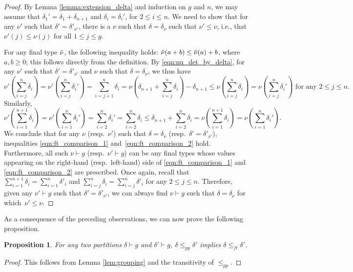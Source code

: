 \documentclass[11pt]{amsart}
\numberwithin{equation}{section}
\theoremstyle{plain}
\newcommand{\<}{\left \langle}
\renewcommand{\>}{\right \rangle}
\newtheorem{prop}[thm]{Proposition}
\theoremstyle{definition}
\theoremstyle{remark}
\begin{document}
\begin{proof} By Lemma \ref{lemma:extension_delta} and induction on $g$ and $n$, we may assume that $\delta_1' = \delta_1 + \delta_{n+1}$ and $\delta_i = \delta_i'$, for $2\leq i \leq n$. We need to show that for any $\nu'$ such that $\delta' = \delta'_{\nu'}$, there is a $\nu$ such that $\delta = \delta_{\nu}$ such that $\nu' \leq \nu$, i.e., that 
$\nu'(j) \leq \nu(j)$ for all $1\leq j \leq g$. 

For any final type $\Tilde{\nu}$, the following inequality holds: $\Tilde{\nu}(a + b) \leq \Tilde{\nu}(a) + b$, where $a, b \geq 0$; this follows directly from the definition. By \eqref{eqn:nu_det_by_delta}, for any $\nu'$ such that $\delta' = \delta'_{\nu'}$ and $\nu$ such that $\delta = \delta_{\nu}$, we thus have 
\begin{equation}
\nu'(\sum_{i = j}^{n}\delta_i) = \nu'(\sum_{i = j}^n\delta_i') = \sum_{i = j + 1}^{n}\delta_i = \nu(\delta_{n + 1} + \sum_{i = j}^{n}\delta_i) - \delta_{n + 1} \leq \nu(\sum_{i = j}^{n}\delta_i) = \nu(\sum_{i = j}^{n}\delta_i') \text{ for any }2\leq j \leq n.
\label{eqn:ft_comparison_1}
\end{equation}
Similarly, 
\begin{equation}
\nu'(\sum_{i = 1}^{n + 1}\delta_i) = \nu'(\sum_{i = 1}^n\delta_i') = \sum_{i = 2}^n\delta_i' = \sum_{i = 2}^n\delta_i \leq \delta_{n + 1} + \sum_{i = 2}^n\delta_i  = \nu(\sum_{i = 1}^{n + 1}\delta_i) = \nu(\sum_{i = 1}^{n}\delta_i').
\label{eqn:ft_comparison_2}
\end{equation}
We conclude that for any $\nu$ (resp.~$\nu'$) such that $\delta = \delta_{\nu}$ (resp.~$\delta' = \delta'_{\nu'}$), inequalities \eqref{eqn:ft_comparison_1} and~\eqref{eqn:ft_comparison_2} hold. Furthermore, all such $\nu\vdash g$ (resp.~$\nu'\vdash g$) can be any final types whose values appearing on the right-hand (resp.~left-hand) side of \eqref{eqn:ft_comparison_1} and \eqref{eqn:ft_comparison_2} are prescribed. 
Once again, recall that $\sum_{i = 1}^{n+1}\delta_i = \sum_{i = 1}^n\delta'_i$ and $\sum_{i = j}^n\delta_i = \sum_{i = j}^n\delta'_i$ for any $2 \leq j \leq n$.
Therefore, given any $\nu' \vdash g$ such that $\delta' = \delta'_{\nu'}$, we can always find $\nu \vdash g$ such that $\delta = \delta_{\nu}$ for which~$\nu' \leq \nu$.
\end{proof}

As a consequence of the preceding observations, we can now prove the following proposition.

\begin{prop}
\label{prop:pp_implies_ft}
For any two partitions $\delta \vdash g$ and $\delta' \vdash g$, $\delta \leq_{pp} \delta'$ implies $\delta \leq_{ft} \delta'$.
\end{prop}
\begin{proof}
This follows from Lemma \ref{lem:grouping} and the transitivity of $\leq_{pp}$. 
\end{proof}
\end{document}
